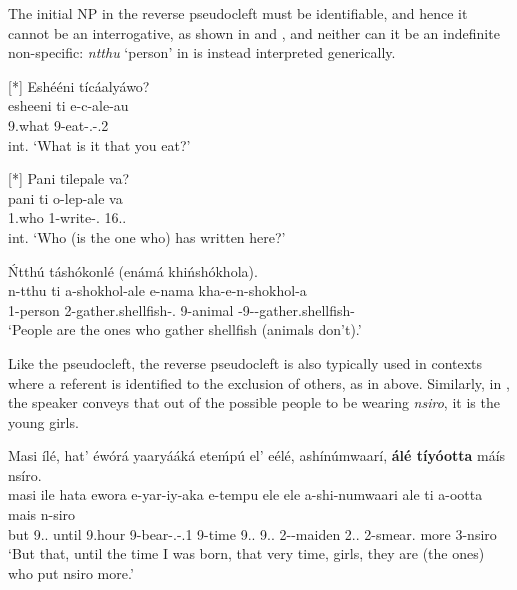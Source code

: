 \documentclass[output=paper]{langscibook}
\begin{document}
\z

The initial NP in the reverse pseudocleft must be identifiable, and hence it cannot be an interrogative, as shown in  and , and neither can it be an indefinite non-specific: \textit{ntthu} ‘person’ in  is instead interpreted generically.


\ea
[*]{
\label{bkm:Ref110412196}
Eshééni tícáalyáwo?\\
\gll
esheeni  ti  e-c-ale-au\\
9.what  \COP{}  9-eat-\PFV{}.\REL{}-\POSS{}.2\SG{}\\
\glt
int. ‘What is it that you eat?’\\
}


\z

\ea
[*]{
\label{bkm:Ref110412198}
Pani tilepale va?\\
\gll
pani  ti  o-lep-ale  va\\
1.who  \COP{}  1-write-\PFV{}.\REL{}  16.\DEM{}.\PROX{}\\
\glt
int. ‘Who (is the one who) has written here?’\\
}


\z

\ea
\label{bkm:Ref110412255}
\'{N}tthú táshókonlé (enámá khińshókhola).\\
\gll
n-tthu  ti  a-shokhol-ale  e-nama  kha-e-n-shokhol-a\\
1-person  \COP{}  2-gather.shellfish-\PFV{}.\REL{}  9-animal  \NEG{}-9-\PRS{}-gather.shellfish-\FV{}\\
\glt
‘People are the ones who gather shellfish (animals don’t).’\\


\z

Like the pseudocleft, the reverse pseudocleft is also typically used in contexts where a referent is identified to the exclusion of others, as in  above. Similarly, in , the speaker conveys that out of the possible people to be wearing \textit{nsiro}, it is the young girls. 

\ea
\label{bkm:Ref96776223}
Masi ílé, hat’ éwórá yaaryááká eteḿpú el’ eélé, ashínúmwaarí, \textbf{álé tíyóotta} máís nsíro.\\
\gll
masi  ile  hata  ewora  e-yar-iy-aka   e-tempu  ele  ele   a-shi-numwaari  ale  ti  a-ootta  mais  n-siro\\
but  9.\DEM{}.\DIST{}  until  9.hour  9-bear-\PASS{}.\REL{}-\POSS{}.1\SG{}   9-time  9.\DEM{}.\DIST{}  9.\DEM{}.\DIST{} 2-\DIM{}-maiden  2.\DEM{}.\DIST{}  \COP{}  2-smear.\REL{}  more  3-nsiro\\
\glt
‘But that, until the time I was born, that very time, girls, they are (the ones) who put nsiro more.’\\
\end{document}
